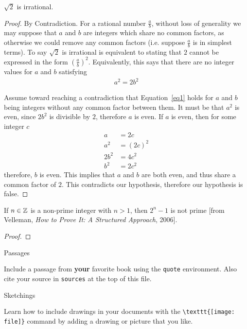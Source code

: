 \documentclass[10pt]{article}
\begin{document}
\begin{theorem}
$\sqrt{2}$ is irrational.
\end{theorem}

\begin{proof}
    By Contradiction. For a rational number $\frac{a}{b}$, without loss of generality we may suppose that $a$ and $b$ are integers which share no common factors, as otherwise we could remove any common factors (i.e. suppose $\frac{a}{b}$ is in simplest terms). To say $\sqrt{2}$ is irrational is equivalent to stating that $2$ cannot be expressed in the form $(\frac{a}{b})^{2}$. Equivalently, this says that there are no integer values for $a$ and $b$ satisfying
    \begin{align}
        \label{eq1}
        a^2 = 2b^2
    \end{align}

    Assume toward reaching a contradiction that Equation~\ref{eq1} holds for $a$ and $b$ being integers without any common factor between them. It must be that $a^2$ is even, since $2b^2$ is divisible by $2$, therefore $a$ is even. If $a$ is even, then for some integer $c$
    \begin{align*}
        a &= 2c \\
        a^2 &= (2c)^2 \\
        2b^2 &= 4c^2 \\
        b^2 &= 2c^2
    \end{align*}
    \noindent therefore, $b$ is even. This implies that $a$ and $b$ are both even, and thus share a common factor of $2$. This contradicts our hypothesis, therefore our hypothesis is false. 
\end{proof}

\begin{theorem}
    If $n \in \mathbb{Z}$ is a non-prime integer with $n>1$, then $2^n - 1$ is not prime [from Velleman, \textit{How to Prove It: A Structured Approach}, 2006].
\end{theorem}

\begin{proof}
\end{proof}


\begin{problem} Passages \end{problem}

    Include a passage from \textbf{your} favorite book using the \texttt{quote} environment. Also cite your source in \texttt{sources} at the top of this file. 


\begin{problem} Sketchings \end{problem}

    Learn how to include drawings in your documents with the \verb|\texttt{[image: file]}| command by adding a drawing or picture that you like. 

\end{document}
